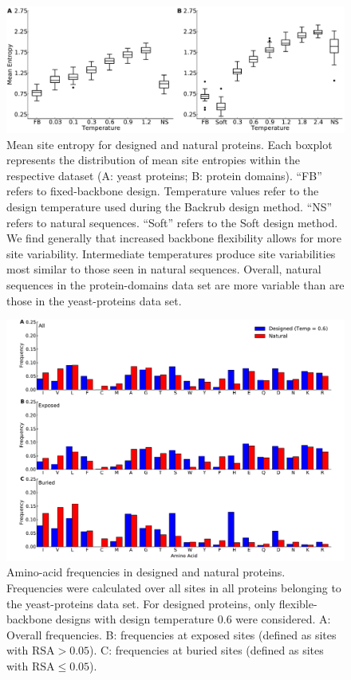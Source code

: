 \documentclass[12pt]{article}
\begin{document}
\begin{figure}[H]
\centerline{\includegraphics[width = 6in]{figures/Mean_Entropy_vs_Temp_Combo_Boxplot.pdf}} %
\caption{Mean site entropy for designed and natural proteins. Each boxplot represents the distribution of mean site entropies within the respective dataset (A: yeast proteins; B: protein domains). ``FB'' refers to fixed-backbone design. Temperature values refer to the design temperature used during the Backrub design method. ``NS'' refers to natural sequences. ``Soft'' refers to the Soft design method. We find generally that increased backbone flexibility allows for more site variability. Intermediate temperatures produce site variabilities most similar to those seen in natural sequences. Overall, natural sequences in the protein-domains data set are more variable than are those in the yeast-proteins data set.}
\label{MeanEntropyComparison}
\end{figure}


\begin{figure}[H]
\centerline{\includegraphics[width = 5in]{figures/Duncan_Freq_Combo_Plots_06.pdf}}
\caption{Amino-acid frequencies in designed and natural proteins. Frequencies were calculated over all sites in all proteins belonging to the yeast-proteins data set. For designed proteins, only flexible-backbone designs with design temperature 0.6 were considered. A: Overall frequencies. B: frequencies at exposed sites (defined as sites with $\text{RSA}>0.05$). C: frequencies at buried sites (defined as sites with $\text{RSA}\leq0.05$).}
\label{AAFreqsYeastProteins}
\end{figure}
\end{document}

